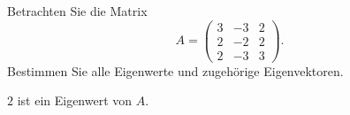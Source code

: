 Betrachten Sie die Matrix
\[
A
=
\begin{pmatrix}
3&-3&2\\
2&-2&2\\
2&-3&3
\end{pmatrix}.
\]
Bestimmen Sie alle Eigenwerte und zugehörige Eigenvektoren.


\begin{hinweis} $2$ ist ein Eigenwert von $A$.
\end{hinweis}


